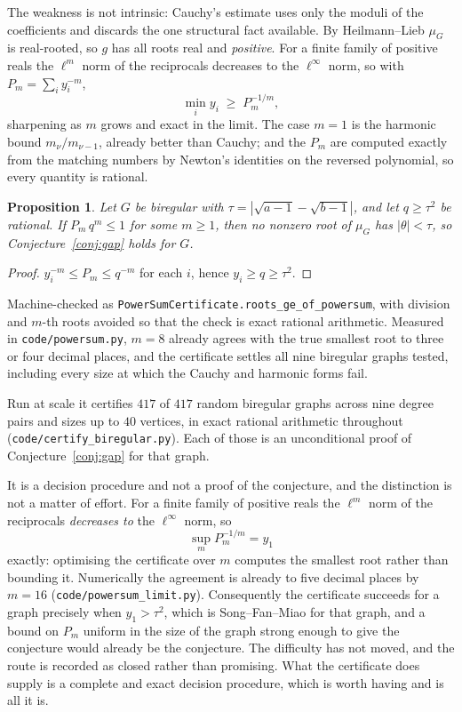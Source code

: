 \documentclass[11pt]{article}
\newtheorem{proposition}[theorem]{Proposition}
\theoremstyle{remark}
\begin{document}
The weakness is not intrinsic: Cauchy's estimate uses only the moduli of the coefficients and
discards the one structural fact available. By Heilmann--Lieb $\mu_G$ is real-rooted, so $g$
has all roots real and \emph{positive}. For a finite family of positive reals the $\ell^m$
norm of the reciprocals decreases to the $\ell^\infty$ norm, so with
$P_m=\sum_i y_i^{-m}$,
\[
   \min_i y_i\;\ge\;P_m^{-1/m},
\]
sharpening as $m$ grows and exact in the limit. The case $m=1$ is the harmonic bound
$m_\nu/m_{\nu-1}$, already better than Cauchy; and the $P_m$ are computed exactly from the
matching numbers by Newton's identities on the reversed polynomial, so every quantity is
rational.

\begin{proposition}\label{prop:powersum}
Let $G$ be biregular with $\tau=|\sqrt{a-1}-\sqrt{b-1}|$, and let $q\ge\tau^2$ be rational.
If $P_m\,q^m\le1$ for some $m\ge1$, then no nonzero root of $\mu_G$ has $|\theta|<\tau$, so
Conjecture~\ref{conj:gap} holds for $G$.
\end{proposition}

\begin{proof}
$y_i^{-m}\le P_m\le q^{-m}$ for each $i$, hence $y_i\ge q\ge\tau^2$.
\end{proof}

Machine-checked as \texttt{PowerSumCertificate.roots\_ge\_of\_powersum}, with division and
$m$-th roots avoided so that the check is exact rational arithmetic. Measured in
\texttt{code/powersum.py}, $m=8$ already agrees with the true smallest root to three or four
decimal places, and the certificate settles all nine biregular graphs tested, including every
size at which the Cauchy and harmonic forms fail.

Run at scale it certifies $417$ of $417$ random biregular graphs across nine degree pairs and
sizes up to $40$ vertices, in exact rational arithmetic throughout
(\texttt{code/certify\_biregular.py}). Each of those is an unconditional proof of
Conjecture~\ref{conj:gap} for that graph.

It is a decision procedure and not a proof of the conjecture, and the distinction is not a
matter of effort. For a finite family of positive reals the $\ell^m$ norm of the reciprocals
\emph{decreases to} the $\ell^\infty$ norm, so
\[
   \sup_m P_m^{-1/m}=y_1
\]
exactly: optimising the certificate over $m$ computes the smallest root rather than bounding
it. Numerically the agreement is already to five decimal places by $m=16$
(\texttt{code/powersum\_limit.py}). Consequently the certificate succeeds for a graph
precisely when $y_1>\tau^2$, which is Song--Fan--Miao for that graph, and a bound on $P_m$
uniform in the size of the graph strong enough to give the conjecture would already be the
conjecture. The difficulty has not moved, and the route is recorded as closed rather than
promising. What the certificate does supply is a complete and exact decision procedure, which
is worth having and is all it is.
\end{document}

